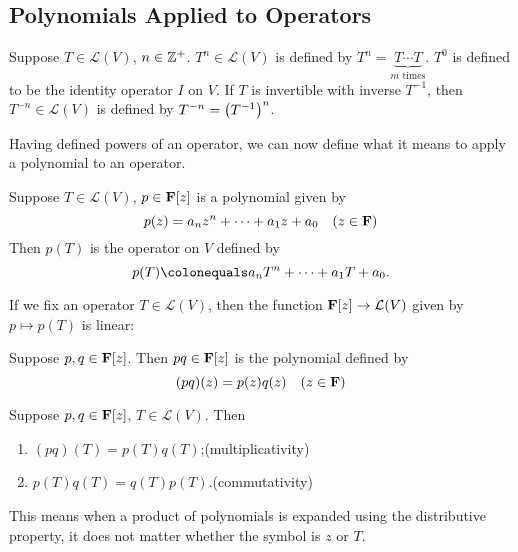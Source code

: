 \subsection{Polynomials Applied to Operators}
\begin{notation}
Suppose $T\in\mathcal{L}(V)$, $n\in\mathbb Z^+$. $T^n\in\mathcal{L}(V)$ is defined by $T^n=\underbrace{T\cdots T}_\text{$m$ times}$. $T^0$ is defined to be the identity operator $I$ on $V$. If $T$ is invertible with inverse $T^{-1}$, then $T^{-n}\in\mathcal{L}(V)$ is defined by $T^{-n}=\left(T^{-1}\right)^n$.
\end{notation}

Having defined powers of an operator, we can now define what it means to apply a polynomial to an operator.

\begin{definition}
Suppose $T\in\mathcal{L}(V)$, $p\in\mathbf F[z]$ is a polynomial given by
\[p(z)=a_nz^n+\cdots+a_1z+a_0\quad(z\in\mathbf F)\]
Then $p(T)$ is the operator on $V$ defined by
\[p(T)\colonequals a_nT^n+\cdots+a_1T+a_0.\]
\end{definition}

If we fix an operator $T\in\mathcal{L}(V)$, then the function $\mathbf F[z]\to\mathcal{L}(V)$ given by $p\mapsto p(T)$ is linear:


\begin{definition}
Suppose $p,q\in\mathbf F[z]$. Then $pq\in\mathbf F[z]$ is the polynomial defined by
\[(pq)(z)=p(z)q(z)\quad(z\in\mathbf F)\]
\end{definition}

\begin{lemma}
Suppose $p,q\in\mathbf F[z]$, $T\in\mathcal{L}(V)$. Then
\begin{enumerate}[label=(\roman*)]
\item $(pq)(T)=p(T)q(T)$;\hfill(multiplicativity)
\item $p(T)q(T)=q(T)p(T)$.\hfill(commutativity)
\end{enumerate}
\end{lemma}

This means when a product of polynomials is expanded using the distributive property, it does not matter whether the symbol is $z$ or $T$.

